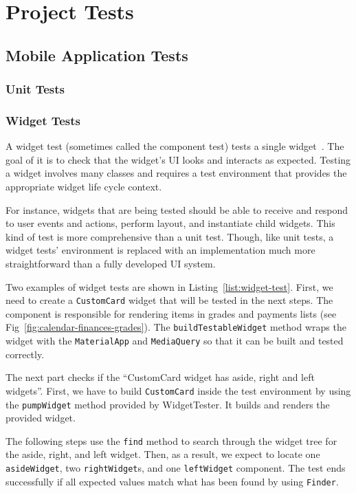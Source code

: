 \chapter{Project Tests}
\section{Mobile Application Tests}
\subsection{Unit Tests}
\subsection{Widget Tests}
A widget test (sometimes called the component test) tests a single widget~\cite{testing-flutter}. The goal of it is to check that the widget's UI looks and interacts as expected. Testing a widget involves many classes and requires a test environment that provides the appropriate widget life cycle context.

For instance, widgets that are being tested should be able to receive and respond to user events and actions, perform layout, and instantiate child widgets. This kind of test is more comprehensive than a unit test. Though, like unit tests, a widget tests' environment is replaced with an implementation much more straightforward than a fully developed UI system.

Two examples of widget tests are shown in Listing~\ref{list:widget-test}. First, we need to create a \texttt{CustomCard} widget that will be tested in the next steps. The component is responsible for rendering items in grades and payments lists (see Fig~\ref{fig:calendar-finances-grades}). The \texttt{buildTestableWidget} method wraps the widget with the \texttt{MaterialApp} and \texttt{MediaQuery} so that it can be built and tested correctly.

The next part checks if the ``CustomCard widget has aside, right and left widgets''. First, we have to build \texttt{CustomCard} inside the test environment by using the \texttt{pumpWidget} method provided by WidgetTester. It builds and renders the provided widget.

The following steps use the \texttt{find} method to search through the widget tree for the aside, right, and left widget. Then, as a result, we expect to locate one \texttt{asideWidget}, two \texttt{rightWidget}s, and one \texttt{leftWidget} component. The test ends successfully if all expected values match what has been found by using \texttt{Finder}.

